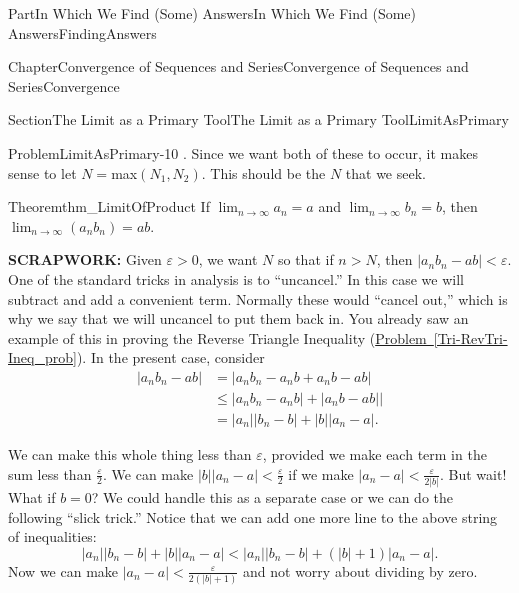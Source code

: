 \documentclass[oneside,10pt,]{book}
\newcommand{\xreffont}{\relax}
\newcommand{\terminology}[1]{\textbf{#1}}
\numberwithin{equation}{part}
\newcommand{\abs}[1]{\left|#1\right|}
\newcommand{\eps}{\varepsilon}
\newcommand{\lt}{<}
\newcommand{\amp}{&}
\begin{document}
\begin{partptx}{Part}{In Which We Find (Some) Answers}{}{In Which We Find (Some) Answers}{}{}{FindingAnswers}
\begin{chapterptx}{Chapter}{Convergence of Sequences and Series}{}{Convergence of Sequences and Series}{}{}{Convergence}
\begin{sectionptx}{Section}{The Limit as a Primary Tool}{}{The Limit as a Primary Tool}{}{}{LimitAsPrimary}
\begin{problem}{Problem}{}{LimitAsPrimary-10}
\frac{\eps}{2}\).  Since we want both of these to occur, it makes sense to let \(N=\)max\(\left(N_1,N_2\right)\).  This should be the \(N\) that we seek.%
\end{problem}
\begin{theorem}{Theorem}{}{}{thm_LimitOfProduct}%
 If \(\displaystyle\lim_{n\rightarrow\infty}a_n=a\) and \(\displaystyle\lim_{n\rightarrow\infty}b_n=b\), then \(\displaystyle\lim_{n\rightarrow\infty}\left(a_n b_n\right)=a b\).%
\end{theorem}
\terminology{SCRAPWORK:} Given \(\eps>0\), we want \(N\) so that if \(n>N\), then \(\abs{a_n  b_n-a  b}\lt \eps\). One of the standard tricks in analysis is to ``uncancel.'' In this case we will subtract and add a convenient term. Normally these would ``cancel out,'' which is why we say that we will uncancel to put them back in. You already saw an example of this in proving the Reverse Triangle Inequality (\hyperref[Tri-RevTri-Ineq_prob]{Problem~{\xreffont\ref{Tri-RevTri-Ineq_prob}}}). In the present case, consider%
\begin{align*}
\abs{a_n  b_n-a  b}\amp =\abs{a_n  b_n-a_n b+a_n b-a  b}\\
\amp \leq \abs{a_n  b_n-a_n  b}+\abs{a_n b-a b}|\\
\amp =\abs{a_n}\abs{b_n-b}+\abs{b}\abs{a_n-a}\text{.}
\end{align*}
%
\par
We can make this whole thing less than \(\eps\), provided we make each term in the sum less than \(\frac{\eps}{2}\).  We can make \(\big|b\big|\big|a_n-a\big|\lt \frac{\eps}{2}\) if we make \(\big|a_n-a\big|\lt \frac{\eps}{2|b|}\).  But wait! What if \(b=0\)?  We could handle this as a separate case or we can do the following ``slick trick.'' Notice that we can add one more line to the above string of inequalities:%
\begin{equation*}
\left|a_n\right|\left|b_n-b\right|+\left|b\right|\left|a_n-a\right|\lt
\left|a_n
\right|\left|b_n-b\right|+\left(\left|b\right|+1\right)\left|a_n-a
\right|\text{.}
\end{equation*}
Now we can make \(\left|a_n-a\right|\lt
\frac{\eps}{2\left(|b|+1\right)}\) and not worry about dividing by zero.%
\par

\end{sectionptx}
\end{chapterptx}
\end{partptx}
\end{document}
